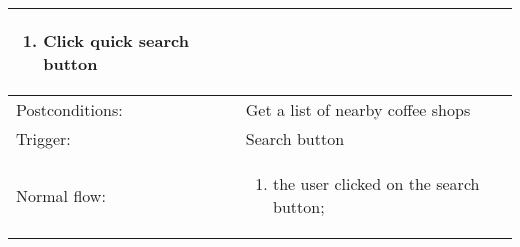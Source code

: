 \begin{longtable}{| p{3.5cm} | p{9cm} |}
\begin{enumerate}
\item Click quick search button 
\end{enumerate}\\
\hline
Postconditions: & Get a list of nearby coffee shops\\
\hline
Trigger: &  Search button\\
\hline
Normal flow: &\mbox{}\par\vspace{-\baselineskip}
\begin{enumerate}
\item the user clicked on the search button;
\end{enumerate}\\
\hline
\end{longtable}

